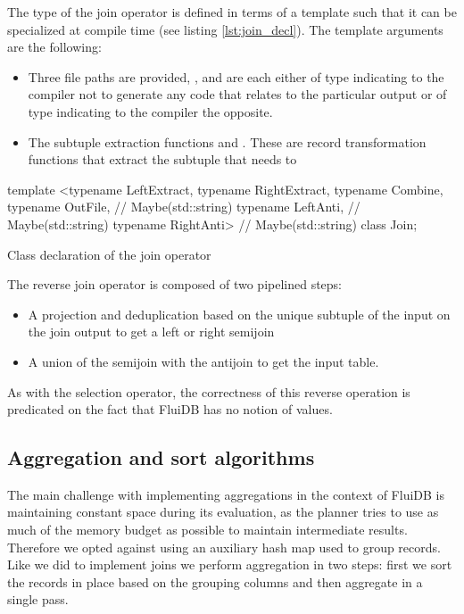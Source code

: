 The type of the join operator is defined in terms of a template such
that it can be specialized at compile time (see listing
\ref{lst:join_decl}). The template arguments are the following:

\begin{itemize}
\item Three file paths are provided, ,  and
   are each either of type  indicating to
  the compiler not to generate any code that relates to the particular
  output or of type  indicating to the compiler
  the opposite.
\item The subtuple extraction functions  and
  . These are record transformation functions that
  extract the subtuple that needs to
\end{itemize}

\begin{code}
\begin{cppcode}
template <typename LeftExtract, typename RightExtract, typename Combine,
          typename OutFile,    // Maybe(std::string)
          typename LeftAnti,   // Maybe(std::string)
          typename RightAnti>  // Maybe(std::string)
class Join;
\end{cppcode}
\caption{\label{lst:join_decl}Class declaration of the join operator}
\end{code}

The reverse join operator is composed of two pipelined steps:

\begin{itemize}
\item A projection and deduplication based on the unique subtuple of
the input on the join output to get a left or right semijoin
\item A union of the semijoin with the antijoin to get the input table.
\end{itemize}

As with the selection operator, the correctness of this reverse
operation is predicated on the fact that FluiDB has no notion of
 values.


\subsection{Aggregation and sort algorithms}

The main challenge with implementing aggregations in the context of
FluiDB is maintaining constant space during its evaluation, as the
planner tries to use as much of the memory budget as possible to
maintain intermediate results. Therefore we opted against using an
auxiliary hash map used to group records. Like we did to implement
joins we perform aggregation in two steps: first we sort the records
in place based on the grouping columns and then aggregate in a single
pass.

